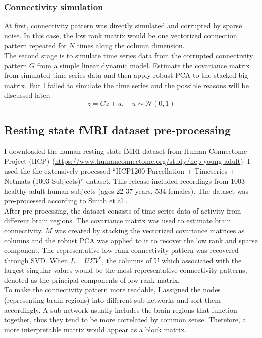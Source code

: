 \documentclass[12pt]{extarticle}
\newcommand{\<}{\langle}
\renewcommand{\>}{\rangle}
\theoremstyle{definition}
\begin{document}
\subsubsection{Connectivity simulation}
At first, connectivity pattern was directly simulated and corrupted by sparse noise. In this case, the low rank matrix would be one vectorized connection pattern repeated for $N$ times along the column dimension. \\
The second stage is to simulate time series data from the corrupted connectivity pattern $G$ from a simple linear dynamic model. Estimate the covariance matrix from simulated time series data and then apply robust PCA to the stacked big matrix. But I failed to simulate the time series and the possible reasons will be discussed later.
\begin{equation}
\label{dcm}
    \dot{z} = Gz+u,\quad u \sim \mathcal{N}(0,1)
\end{equation}

\subsection{Resting state fMRI dataset pre-processing}
I downloaded the human resting state fMRI dataset from Human Connectome Project (HCP) (\url{https://www.humanconnectome.org/study/hcp-young-adult}). I used the the extensively processed ``HCP1200 Parcellation + Timeseries + Netmats (1003 Subjects)'' dataset. This release included recordings from 1003 healthy adult human subjects (ages 22-37 years, 534 females). The dataset was pre-processed according to Smith et al \cite{smith2013resting}. \\
After pre-processing, the dataset consists of time series data of activity from different brain regions. The covariance matrix was used to estimate brain connectivity. $M$ was created by stacking the vectorized covariance matrices as columns and the robust PCA was applied to it to recover the low rank and sparse component. The representative low-rank connectivity pattern was recovered through SVD. When $L = U\Sigma V^*$, the columns of U which associated with the largest singular values would be the most representative connectivity patterns, denoted as the principal components of low rank matrix. \\
To make the connectivity pattern more readable, I assigned the nodes (representing brain regions) into different sub-networks and sort them accordingly. A sub-network usually includes the brain regions that function together, thus they tend to be more correlated by common sense. Therefore, a more interpretable matrix would appear as a block matrix.
\end{document}
